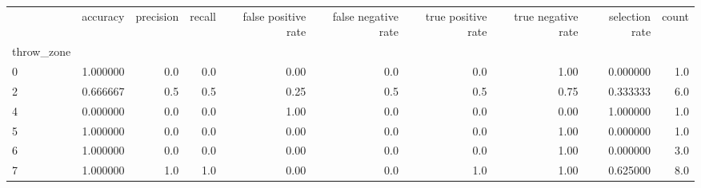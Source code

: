 \begin{tabular}{lrrrrrrrrr}
\toprule
{} &  accuracy &  precision &  recall &  false positive rate &  false negative rate &  true positive rate &  true negative rate &  selection rate &  count \\
throw\_zone &           &            &         &                      &                      &                     &                     &                 &        \\
\midrule
0          &  1.000000 &        0.0 &     0.0 &                 0.00 &                  0.0 &                 0.0 &                1.00 &        0.000000 &    1.0 \\
2          &  0.666667 &        0.5 &     0.5 &                 0.25 &                  0.5 &                 0.5 &                0.75 &        0.333333 &    6.0 \\
4          &  0.000000 &        0.0 &     0.0 &                 1.00 &                  0.0 &                 0.0 &                0.00 &        1.000000 &    1.0 \\
5          &  1.000000 &        0.0 &     0.0 &                 0.00 &                  0.0 &                 0.0 &                1.00 &        0.000000 &    1.0 \\
6          &  1.000000 &        0.0 &     0.0 &                 0.00 &                  0.0 &                 0.0 &                1.00 &        0.000000 &    3.0 \\
7          &  1.000000 &        1.0 &     1.0 &                 0.00 &                  0.0 &                 1.0 &                1.00 &        0.625000 &    8.0 \\
\bottomrule
\end{tabular}

